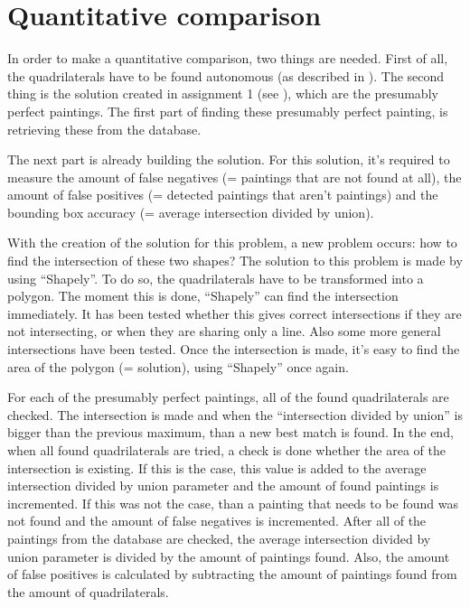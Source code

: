 

\section{Quantitative comparison}
In order to make a quantitative comparison, two things are needed. First of all, the quadrilaterals have to be found autonomous (as described in ). The second thing is the solution created in assignment 1 (see ), which are the presumably perfect paintings. The first part of finding these presumably perfect painting, is retrieving these from the database.

The next part is already building the solution. For this solution, it's required to measure the amount of false negatives (= paintings that are not found at all), the amount of false positives (= detected paintings that aren't paintings) and the bounding box accuracy (= average intersection divided by union).

With the creation of the solution for this problem, a new problem occurs: how to find the intersection of these two shapes? The solution to this problem is made by using ``Shapely''. To do so, the quadrilaterals have to be transformed into a polygon. The moment this is done, ``Shapely'' can find the intersection immediately. It has been tested whether this gives correct intersections if they are not intersecting, or when they are sharing only a line. Also some more general intersections have been tested. Once the intersection is made, it's easy to find the area of the polygon (= solution), using ``Shapely'' once again.

For each of the presumably perfect paintings, all of the found quadrilaterals are checked. The intersection is made and when the ``intersection divided by union'' is bigger than the previous maximum, than a new best match is found. In the end, when all found quadrilaterals are tried, a check is done whether the area of the intersection is existing. If this is the case, this value is added to the average intersection divided by union parameter and the amount of found paintings is incremented. If this was not the case, than a painting that needs to be found was not found and the amount of false negatives is incremented. After all of the paintings from the database are checked, the average intersection divided by union parameter is divided by the amount of paintings found. Also, the amount of false positives is calculated by subtracting the amount of paintings found from the amount of quadrilaterals.

